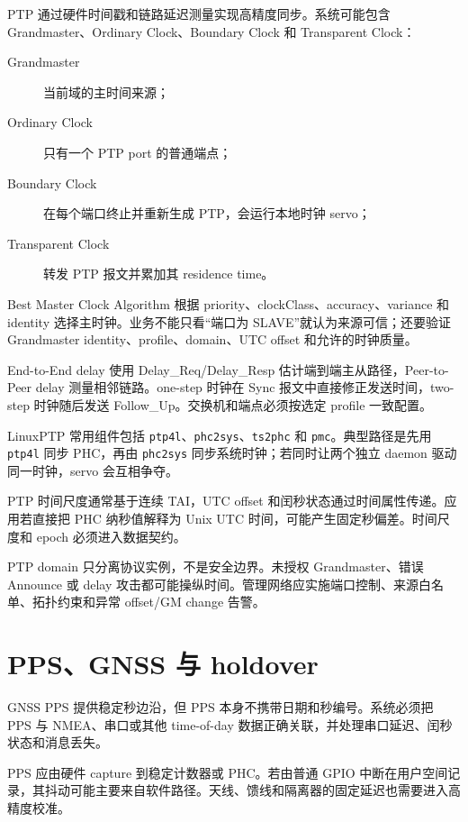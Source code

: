 PTP 通过硬件时间戳和链路延迟测量实现高精度同步\cite{ieee1588-2019}。系统可能包含 Grandmaster、Ordinary Clock、Boundary Clock 和 Transparent Clock：

\begin{description}
  \item[Grandmaster] 当前域的主时间来源；
  \item[Ordinary Clock] 只有一个 PTP port 的普通端点；
  \item[Boundary Clock] 在每个端口终止并重新生成 PTP，会运行本地时钟 servo；
  \item[Transparent Clock] 转发 PTP 报文并累加其 residence time。
\end{description}

Best Master Clock Algorithm 根据 priority、clockClass、accuracy、variance 和 identity 选择主时钟。业务不能只看“端口为 SLAVE”就认为来源可信；还要验证 Grandmaster identity、profile、domain、UTC offset 和允许的时钟质量。

End-to-End delay 使用 Delay\_Req/Delay\_Resp 估计端到端主从路径，Peer-to-Peer delay 测量相邻链路。one-step 时钟在 Sync 报文中直接修正发送时间，two-step 时钟随后发送 Follow\_Up。交换机和端点必须按选定 profile 一致配置。

LinuxPTP 常用组件包括 \texttt{ptp4l}、\texttt{phc2sys}、\texttt{ts2phc} 和 \texttt{pmc}\cite{linuxptp-doc}。典型路径是先用 \texttt{ptp4l} 同步 PHC，再由 \texttt{phc2sys} 同步系统时钟；若同时让两个独立 daemon 驱动同一时钟，servo 会互相争夺。

PTP 时间尺度通常基于连续 TAI，UTC offset 和闰秒状态通过时间属性传递。应用若直接把 PHC 纳秒值解释为 Unix UTC 时间，可能产生固定秒偏差。时间尺度和 epoch 必须进入数据契约。

PTP domain 只分离协议实例，不是安全边界。未授权 Grandmaster、错误 Announce 或 delay 攻击都可能操纵时间。管理网络应实施端口控制、来源白名单、拓扑约束和异常 offset/GM change 告警。

\section{PPS、GNSS 与 holdover}

GNSS PPS 提供稳定秒边沿，但 PPS 本身不携带日期和秒编号。系统必须把 PPS 与 NMEA、串口或其他 time-of-day 数据正确关联，并处理串口延迟、闰秒状态和消息丢失。

PPS 应由硬件 capture 到稳定计数器或 PHC。若由普通 GPIO 中断在用户空间记录，其抖动可能主要来自软件路径。天线、馈线和隔离器的固定延迟也需要进入高精度校准。

